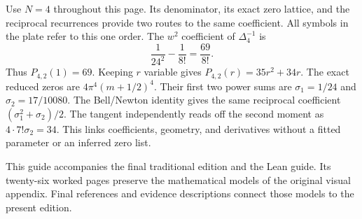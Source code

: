 Use $N=4$ throughout this page. Its denominator, its exact zero lattice, and the reciprocal recurrences provide two routes to the same coefficient. All symbols in the plate refer to this one order.
The $w^2$ coefficient of $\Delta_4^{-1}$ is
\[
\frac1{24^2}-\frac1{8!}=\frac{69}{8!}.
\]
Thus $P_{4,2}(1)=69$. Keeping $r$ variable gives $P_{4,2}(r)=35r^2+34r$.
The exact reduced zeros are $4\pi^4(m+1/2)^4$. Their first two power sums are $\sigma_1=1/24$ and $\sigma_2=17/10080$. The Bell/Newton identity gives the same reciprocal coefficient $(\sigma_1^2+\sigma_2)/2$. The tangent independently reads off the second moment as $4\cdot7!\sigma_2=34$.
This links coefficients, geometry, and derivatives without a fitted parameter or an inferred zero list.

This guide accompanies the final traditional edition and the Lean guide. Its twenty-six worked pages preserve the mathematical models of the original visual appendix. Final references and evidence descriptions connect those models to the present edition.

